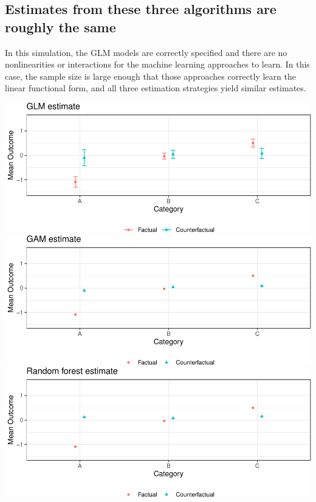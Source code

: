 \documentclass[
]{article}
\begin{document}
\hypertarget{estimates-from-these-three-algorithms-are-roughly-the-same}{%
\subsection{Estimates from these three algorithms are roughly the same}\label{estimates-from-these-three-algorithms-are-roughly-the-same}}

In this simulation, the GLM models are correctly specified and there are no nonlinearities or interactions for the machine learning approaches to learn. In this case, the sample size is large enough that those approaches correctly learn the linear functional form, and all three estimation strategies yield similar estimates.

\includegraphics{github_doc_files/figure-latex/unnamed-chunk-23-1.pdf} \includegraphics{github_doc_files/figure-latex/unnamed-chunk-23-2.pdf} \includegraphics{github_doc_files/figure-latex/unnamed-chunk-23-3.pdf}
\end{document}
